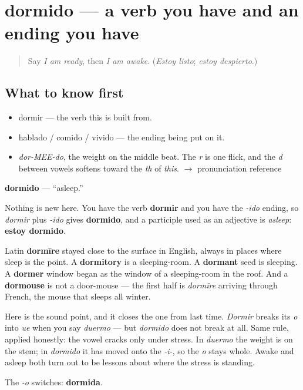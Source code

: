 \section[dormido]{dormido — a verb you have and an ending you have}

\label{lesson:ES-C327-dormido}



\begin{quote}
Say \emph{I am ready}, then \emph{I am awake}. (\emph{Estoy listo}; \emph{estoy despierto}.)
\end{quote}

\subsection*{What to know first}
\begin{itemize}
\raggedright
  \item dormir — the verb this is built from.
  \item hablado / comido / vivido — the ending being put on it.
\end{itemize}

\begin{sounds}
\begin{itemize}
\raggedright
  \item \emph{dor-MEE-do}, the weight on the middle beat. The \emph{r} is one flick, and the \emph{d} between vowels softens toward the \emph{th} of \emph{this}. $\to$ pronunciation reference
\end{itemize}
\end{sounds}

\begin{cousinweb}
\textbf{dormido} — \textquotedblleft{}asleep.\textquotedblright{}

Nothing is new here. You have the verb \textbf{dormir} and you have the \emph{-ido} ending, so \emph{dormir} plus \emph{-ido} gives \textbf{dormido}, and a participle used as an adjective is \emph{asleep}: \textbf{estoy dormido}.

Latin \textbf{dormīre} stayed close to the surface in English, always in places where sleep is the point. A \textbf{dormitory} is a sleeping-room. A \textbf{dormant} seed is sleeping. A \textbf{dormer} window began as the window of a sleeping-room in the roof. And a \textbf{dormouse} is not a door-mouse — the first half is \emph{dormīre} arriving through French, the mouse that sleeps all winter.

Here is the sound point, and it closes the one from last time. \emph{Dormir} breaks its \emph{o} into \emph{ue} when you say \emph{duermo} — but \emph{dormido} does not break at all. Same rule, applied honestly: the vowel cracks only under stress. In \emph{duermo} the weight is on the stem; in \emph{dormido} it has moved onto the \emph{-i-}, so the \emph{o} stays whole. Awake and asleep both turn out to be lessons about where the stress is standing.

The \emph{-o} switches: \textbf{dormida}.
\end{cousinweb}

